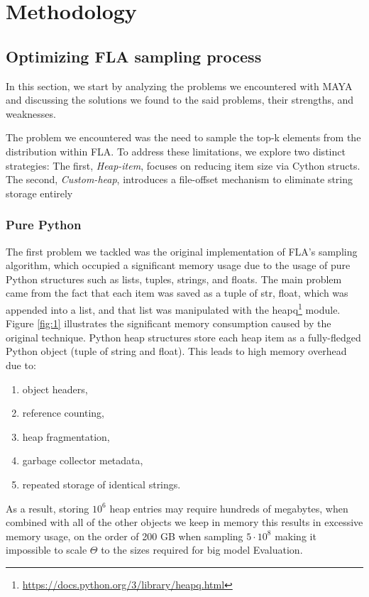 \documentclass[english,noexaminfo,a4paper,oneside, binding = 0.6cm]{sapthesis}
\begin{document}
\chapter{Methodology}
\label{chap:4}
\section{Optimizing FLA sampling process}
\label{sec:Opt}
In this section, we start by analyzing the problems we encountered with MAYA and discussing the solutions we found to the said problems, their strengths, and weaknesses.

The problem we encountered was the need to sample the top-k elements from the distribution within FLA.
To address these limitations, we  explore two distinct strategies: 
The first, \textit{Heap-item}, focuses on reducing item size via Cython structs. The second, \textit{Custom-heap}, introduces a file-offset mechanism to eliminate string storage entirely\subsection{Pure Python}
\label{PurePython}
The first problem we tackled was the original implementation of FLA's sampling algorithm\cite{ref:fla}, which occupied a significant memory usage due to the usage of pure Python structures such as lists, tuples, strings, and floats.
The main problem came from the fact that each item was saved as a tuple of str, float, which was appended into a list, and that list was manipulated with the heapq\footnote{\url{https://docs.python.org/3/library/heapq.html}} module.
Figure \ref{fig:1} illustrates the significant memory consumption caused by the original technique.
Python heap structures store each heap item as a fully-fledged Python object
(tuple of string and float). This leads to high memory overhead due to:
\begin{enumerate}
  \item object headers,
  \item reference counting,
  \item heap fragmentation,
  \item garbage collector metadata,
  \item repeated storage of identical strings.
\end{enumerate}

As a result, storing $10^6$ heap entries may require hundreds of megabytes,
when combined with all of the other objects we keep in memory this results in excessive memory usage, on the order of 200 GB when sampling $5\cdot10^8$ making it impossible to scale $\Theta$ to the sizes required for big model Evaluation.
\end{document}
